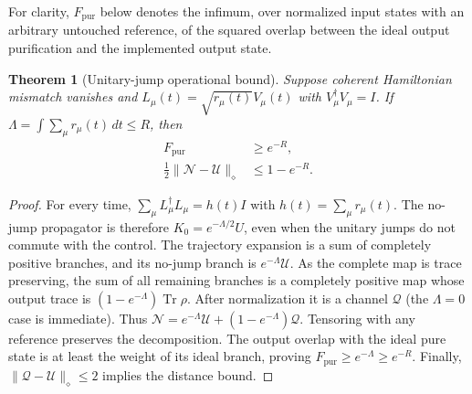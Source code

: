 \documentclass[10pt,letterpaper,journal]{IEEEtran}
\newtheorem{theorem}{Theorem}
\begin{document}
For clarity, $F_{\mathrm{pur}}$ below denotes the infimum, over normalized input states with an arbitrary untouched reference, of the squared overlap between the ideal output purification and the implemented output state.
\begin{theorem}[Unitary-jump operational bound]\label{th:noise}
Suppose coherent Hamiltonian mismatch vanishes and $L_\mu(t)=\sqrt{r_\mu(t)}V_\mu(t)$ with $V_\mu^\dagger V_\mu=I$. If $\Lambda=\int\sum_\mu r_\mu(t)\,dt\le R$, then
\begin{align}
F_{\mathrm{pur}}&\ge e^{-R},\\
\tfrac12\|\mathcal N-\mathcal U\|_\diamond&\le1-e^{-R}.
\end{align}
\end{theorem}
\begin{proof}
For every time, $\sum_\mu L_\mu^\dagger L_\mu=h(t)I$ with $h(t)=\sum_\mu r_\mu(t)$. The no-jump propagator is therefore $K_0=e^{-\Lambda/2}U$, even when the unitary jumps do not commute with the control. The trajectory expansion is a sum of completely positive branches, and its no-jump branch is $e^{-\Lambda}\mathcal U$. As the complete map is trace preserving, the sum of all remaining branches is a completely positive map whose output trace is $(1-e^{-\Lambda})\operatorname{Tr}\rho$. After normalization it is a channel $\mathcal Q$ (the $\Lambda=0$ case is immediate). Thus $\mathcal N=e^{-\Lambda}\mathcal U+(1-e^{-\Lambda})\mathcal Q$. Tensoring with any reference preserves the decomposition. The output overlap with the ideal pure state is at least the weight of its ideal branch, proving $F_{\mathrm{pur}}\ge e^{-\Lambda}\ge e^{-R}$. Finally, $\|\mathcal Q-\mathcal U\|_\diamond\le2$ implies the distance bound.
\end{proof}
\end{document}
